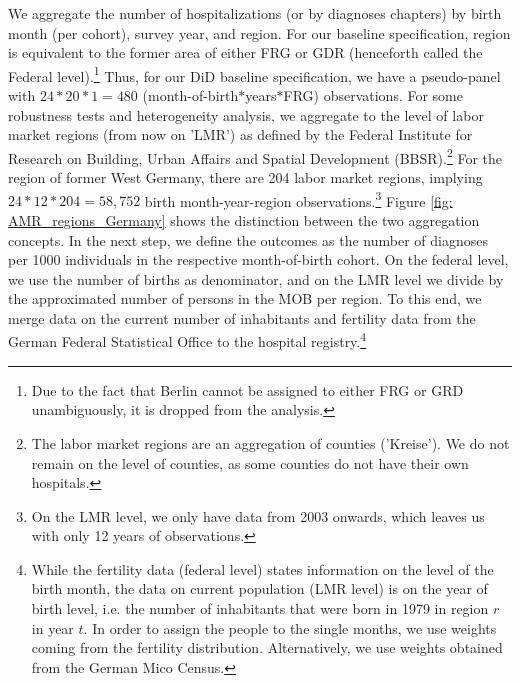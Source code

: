 \documentclass[11pt, a4paper]{article} %
\begin{document}
We aggregate the number of hospitalizations (or by diagnoses chapters) by birth month (per cohort), survey year, and region. For our baseline specification, region is equivalent to the former area of either FRG or GDR (henceforth called the Federal level).\footnote{Due to the fact that Berlin cannot be assigned to either FRG or GRD unambiguously, it is dropped from the analysis.} Thus, for our DiD baseline specification, we have a pseudo-panel with $24*20*1=480$ (month-of-birth$*$years$*$FRG) observations. For some robustness tests and heterogeneity analysis, we aggregate to the level of labor market regions (from now on 'LMR') as defined by the Federal Institute  for Research on Building, Urban Affairs and Spatial Development (BBSR).\footnote{The labor market regions are an aggregation of counties ('Kreise'). We do not remain on the level of counties, as some counties do not have their own hospitals.} For the region of former West Germany, there are 204 labor market regions, implying $24*12*204= 58,752$ birth month-year-region observations.\footnote{On the LMR level, we only have data from 2003 onwards, which leaves us with only 12 years of observations.} Figure \ref{fig: AMR_regions_Germany} shows the distinction between the two aggregation concepts. \newline %
In the next step, we define the outcomes as the number of diagnoses per 1000 individuals in the respective month-of-birth cohort. On the federal level, we use the number of births as denominator, and on the LMR level we divide by the approximated number of persons in the MOB per region. To this end, we merge data on the current number of inhabitants and fertility data from the German Federal Statistical Office to the hospital registry.\footnote{While the fertility data (federal level) states information on the level of the birth month, the data on current population (LMR level) is on the year of birth level, i.e. the number of inhabitants that were born in 1979 in region $r$ in year $t$. In order to assign the people to the single months, we use weights coming from the fertility distribution. Alternatively, we use weights obtained from the German Mico Census.}\newline


\end{document}

